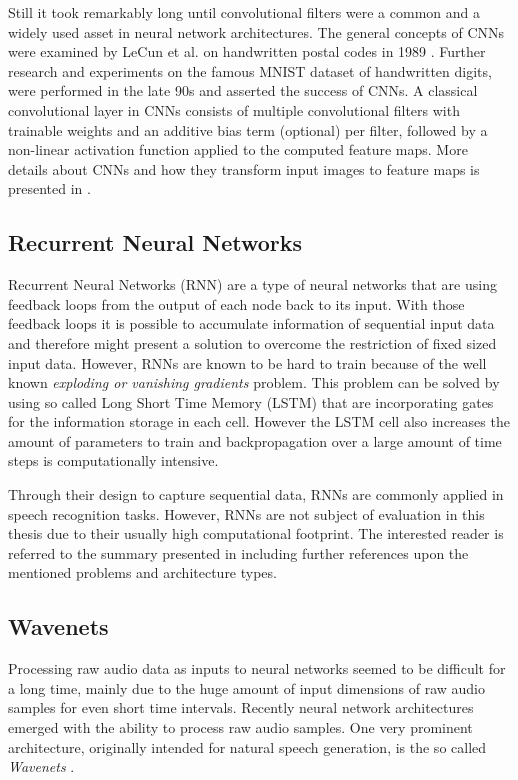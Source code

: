 Still it took remarkably long until convolutional filters were a common and a widely used asset in neural network architectures.
The general concepts of CNNs were examined by LeCun et al. on handwritten postal codes in 1989 \cite{LeCun1989_Generalization}.
Further research and experiments on the famous MNIST dataset of handwritten digits, were performed in the late 90s \cite{LeCun1998} and asserted the success of CNNs.
A classical convolutional layer in CNNs consists of multiple convolutional filters with trainable weights and an additive bias term (optional) per filter, followed by a non-linear activation function applied to the computed feature maps.
More details about CNNs and how they transform input images to feature maps is presented in .



\subsection{Recurrent Neural Networks}\label{sec:prev_nn_rnn}
Recurrent Neural Networks (RNN) are a type of neural networks that are using feedback loops from the output of each node back to its input.
With those feedback loops it is possible to accumulate information of sequential input data and therefore might present a solution to overcome the restriction of fixed sized input data.
However, RNNs are known to be hard to train because of the well known \emph{exploding or vanishing gradients} problem.
This problem can be solved by using so called Long Short Time Memory (LSTM) that are incorporating gates for the information storage in each cell. 
However the LSTM cell also increases the amount of parameters to train and backpropagation over a large amount of time steps is computationally intensive.

Through their design to capture sequential data, RNNs are commonly applied in speech recognition tasks.
However, RNNs are not subject of evaluation in this thesis due to their usually high computational footprint.
The interested reader is referred to the summary presented in \cite{Staudenmeyer2019} including further references upon the mentioned problems and architecture types.



\subsection{Wavenets}\label{sec:prev_nn_wavenet}
Processing raw audio data as inputs to neural networks seemed to be difficult for a long time, mainly due to the huge amount of input dimensions of raw audio samples for even short time intervals.
Recently neural network architectures emerged with the ability to process raw audio samples.
One very prominent architecture, originally intended for natural speech generation, is the so called \emph{Wavenets} \cite{Oord2016}.

